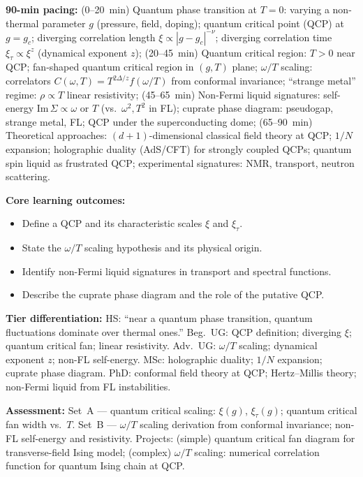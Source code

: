 \documentclass[11pt,a4paper]{article}
\begin{document}
\medskip

\begin{tcolorbox}[modulebox, title={Module~II.7 / L10: Quantum Criticality}]
\textbf{90-min pacing:} (0--20~min) Quantum phase transition at $T=0$: varying a non-thermal parameter $g$ (pressure, field, doping); quantum critical point (QCP) at $g=g_c$; diverging correlation length $\xi\propto|g-g_c|^{-\nu}$; diverging correlation time $\xi_\tau\propto\xi^z$ (dynamical exponent $z$); (20--45~min) Quantum critical region: $T>0$ near QCP; fan-shaped quantum critical region in $(g,T)$ plane; $\omega/T$ scaling: correlators $C(\omega,T)=T^{2\Delta/z}f(\omega/T)$ from conformal invariance; ``strange metal'' regime: $\rho\propto T$ linear resistivity; (45--65~min) Non-Fermi liquid signatures: self-energy Im$\,\Sigma\propto\omega$ or $T$ (vs.\ $\omega^2,T^2$ in FL); cuprate phase diagram: pseudogap, strange metal, FL; QCP under the superconducting dome; (65--90~min) Theoretical approaches: $(d+1)$-dimensional classical field theory at QCP; $1/N$ expansion; holographic duality (AdS/CFT) for strongly coupled QCPs; quantum spin liquid as frustrated QCP; experimental signatures: NMR, transport, neutron scattering.

\medskip\textbf{Core learning outcomes:}
\begin{itemize}[leftmargin=1.4em,topsep=2pt,itemsep=1pt]
  \item Define a QCP and its characteristic scales $\xi$ and $\xi_\tau$.
  \item State the $\omega/T$ scaling hypothesis and its physical origin.
  \item Identify non-Fermi liquid signatures in transport and spectral functions.
  \item Describe the cuprate phase diagram and the role of the putative QCP.
\end{itemize}

\medskip\textbf{Tier differentiation:}
HS: ``near a quantum phase transition, quantum fluctuations dominate over thermal ones.''
Beg.\ UG: QCP definition; diverging $\xi$; quantum critical fan; linear resistivity.
Adv.\ UG: $\omega/T$ scaling; dynamical exponent $z$; non-FL self-energy.
MSc: holographic duality; $1/N$ expansion; cuprate phase diagram.
PhD: conformal field theory at QCP; Hertz--Millis theory; non-Fermi liquid from FL instabilities.

\medskip\textbf{Assessment:}
Set~A --- quantum critical scaling: $\xi(g)$, $\xi_\tau(g)$; quantum critical fan width vs.\ $T$.
Set~B --- $\omega/T$ scaling derivation from conformal invariance; non-FL self-energy and resistivity.
Projects: (simple) quantum critical fan diagram for transverse-field Ising model;
(complex) $\omega/T$ scaling: numerical correlation function for quantum Ising chain at QCP.
\end{tcolorbox}
\end{document}
